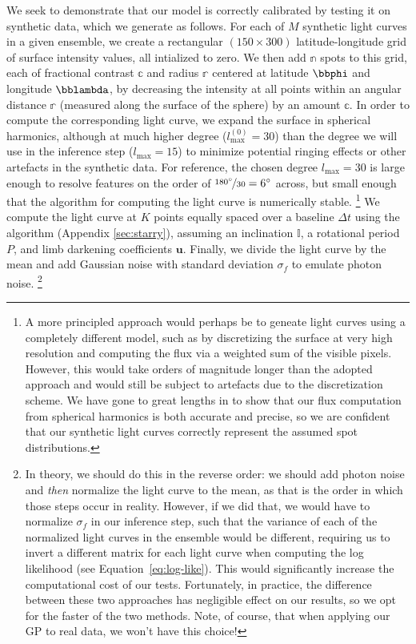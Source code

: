 \documentclass[modern]{aastex62}
\begin{document}
We seek to demonstrate that our model is correctly calibrated by testing it
on synthetic data, which we generate as follows. For each of $M$ synthetic
light curves in a given ensemble,
we create a rectangular
$(150 \times 300)$ latitude-longitude grid of surface intensity values, all
intialized
to zero. We then add $\mathbb{n}$ spots to this grid, each of fractional contrast
$\mathbb{c}$ and radius $\mathbb{r}$ centered at latitude $\bbphi$ and longitude $\bblambda$,
by decreasing the intensity at all points within an angular distance $\mathbb{r}$
(measured along the surface of the sphere) by an amount $\mathbb{c}$.
In order to compute the corresponding light curve, we expand the surface
in spherical harmonics, although at much higher degree
($l_\mathrm{max}^{(0)} = 30$)
than the degree we will use in the inference step ($l_\mathrm{max} = 15$)
to minimize potential ringing effects or other artefacts in the synthetic
data. For reference, the chosen degree $l_\mathrm{max} = 30$ is large
enough to resolve features on the order of
$\nicefrac{180^\circ}{30} = 6^\circ$ across, but small enough that
the algorithm for computing the light curve is numerically stable.%
\footnote{%
    A more principled approach would perhaps be to geneate light curves using
    a completely different model, such as by discretizing the surface at very
    high resolution and computing the flux via a weighted sum of the visible
    pixels. However, this would take orders of magnitude longer than the adopted
    approach and would still be subject to artefacts due to the discretization
    scheme. We have gone to great lengths in \citet{Luger2019} to show that
    our flux computation from spherical harmonics is both accurate and precise,
    so we are confident that our synthetic light curves correctly represent the
    assumed spot distributions.
}
We compute the light curve at $K$ points equally spaced over a baseline $\Delta t$
using the \starry algorithm
(Appendix \ref{sec:starry}), assuming an inclination $\mathbb{I}$, a rotational period $P$,
and limb darkening coefficients $\mathbf{u}$. Finally, we divide the
light curve by the mean and add Gaussian noise with standard deviation $\sigma_f$
to emulate photon noise.%
\footnote{
    In theory, we should do this in the reverse order: we should add photon
    noise and \emph{then} normalize the light curve to the mean, as that is the order in which
    those steps occur in reality. However, if we did that, we would have to normalize $\sigma_f$
    in our inference step, such that the variance of each of the normalized light curves
    in the ensemble would be different, requiring us to invert a different matrix for
    each light curve when computing the log likelihood (see Equation~\ref{eq:log-like}).
    This would significantly increase the computational cost of our tests. Fortunately, in
    practice, the difference between these two approaches has negligible effect on
    our results, so we opt for the faster of the two methods. Note, of course,
    that when applying our GP to real data, we won't have this choice!
}
\end{document}
